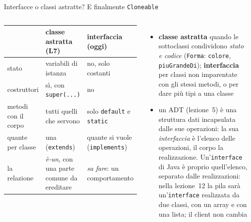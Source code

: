 \documentclass[10pt,aspectratio=169]{beamer}
\begin{document}
\begin{frame}[fragile]{Interfacce o classi astratte? E finalmente \texttt{Cloneable}}
\begin{columns}[T]
\footnotesize
\begin{center}
\renewcommand{\arraystretch}{1.0}
\scriptsize
\begin{tabular}{@{}>{\raggedright\arraybackslash}p{2.1cm}>{\raggedright\arraybackslash}p{2.8cm}>{\raggedright\arraybackslash}p{2.8cm}@{}}
\toprule
 & \textbf{classe astratta} (L7) & \textbf{interfaccia} (oggi) \\
\midrule
stato & variabili di istanza & no, solo costanti \\
costruttori & sì, con \texttt{super(...)} & no \\
metodi con il corpo & tutti quelli che servono & solo \texttt{default} e \texttt{static} \\
quante per classe & una (\texttt{extends}) & quante si vuole (\texttt{implements}) \\
la relazione & \emph{è-un}, con una parte comune da ereditare & \emph{sa fare}: un comportamento \\
\bottomrule
\end{tabular}
\end{center}
\begin{itemize}\itemsep=2pt
    \item \textbf{classe astratta} quando le sottoclassi condividono \emph{stato e codice} (\texttt{Forma}: \texttt{colore}, \texttt{piuGrandeDi}); \textbf{interfaccia} per classi non imparentate con gli stessi metodi, o per dare più tipi a una classe
    \item un ADT (lezione~5) è una struttura dati incapsulata dalle sue operazioni: la sua \emph{interfaccia} è l'elenco delle operazioni, il corpo la realizzazione. Un'\texttt{interface} di Java è proprio quell'elenco, separato dalle realizzazioni: nella lezione~12 la pila sarà un'\texttt{interface} realizzata da due classi, con un array e con una lista; il client non cambia
\end{itemize}


\end{columns}
\end{frame}
\end{document}
